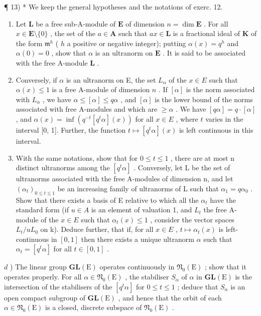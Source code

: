 ¶ 13) * We keep the general hypotheses and the notations of exerc. 12.

\begin{enumerate}
\def\labelenumi{\alph{enumi})}
\item
  Let \(\mathbf{L}\) be a free sub-A-module of \(\mathbf{E}\) of dimension \(n = \dim \mathbf{E}\) . For all \(x \in \mathbf{E} \setminus \{0\}\) , the set of the \(a \in \mathbf{A}\) such that \(ax \in \mathbf{L}\) is a fractional ideal of \(\mathbf{K}\) of the form \(\mathfrak{m}^h\) ( \(h\) a positive or negative integer); putting \(\alpha(x) = q^h\) and \(\alpha(0) = 0\) , show that \(\alpha\) is an ultranorm on \(\mathbf{E}\) . It is said to be associated with the free A-module \(\mathbf{L}\) .
\item
  Conversely, if \(\alpha\) is an ultranorm on E, the set \(L_{\alpha}\) of the \(x \in E\) such that \(\alpha(x) \leqslant 1\) is a free A-module of dimension \(n\) . If \([\alpha]\) is the norm associated with \(L_{\alpha}\) , we have \(\alpha \leqslant [\alpha] \leqslant q\alpha\) , and \([\alpha]\) is the lower bound of the norms associated with free A-modules and which are \(\geqslant \alpha\) . We have \([q\alpha] = q \cdot [\alpha]\) , and \(\alpha(x) = \inf(q^{-t}[q^t\alpha](x))\) for all \(x \in E\) , where \(t\) varies in the interval {[}0, 1{]}. Further, the function \(t \mapsto [q^t\alpha](x)\) is left continuous in this interval.
\item
  With the same notations, show that for \(0 \leqslant t \leqslant 1\) , there are at most n distinct ultranorms among the \([q^{t}\alpha]\) . Conversely, let L be the set of ultranorms associated with the free A-modules of dimension n, and let \((\alpha_{t})_{0 \leqslant t \leqslant 1}\) be an increasing family of ultranorms of L such that \(\alpha_{1} = q\alpha_{0}\) . Show that there exists a basis of E relative to which all the \(\alpha_{t}\) have the standard form (if \(u \in A\) is an element of valuation 1, and \(L_{t}\) the free A-module of the \(x \in E\) such that \(\alpha_{t}(x) \leqslant 1\) , consider the vector spaces \(L_{t}/uL_{0}\) on k). Deduce further, that if, for all \(x \in E\) , \(t \mapsto \alpha_{t}(x)\) is left-continuous in \([0, 1]\) then there exists a unique ultranorm \(\alpha\) such that \(\alpha_{t} = [q^{t}\alpha]\) for all \(t \in [0, 1]\) .
\end{enumerate}

\(d\) ) The linear group \(\mathbf{GL}(\mathrm{E})\) operates continuously in \(\mathfrak{N}_0(\mathrm{E})\) ; show that it operates properly. For all \(\alpha \in \mathfrak{N}_0(\mathrm{E})\) , the stabiliser \(S_{\alpha}\) of \(\alpha\) in \(\mathbf{GL}(\mathrm{E})\) is the intersection of the stabilisers of the \([q^t\alpha]\) for \(0\leqslant t\leqslant 1\) ; deduce that \(S_{\alpha}\) is an open compact subgroup of \(\mathbf{GL}(\mathrm{E})\) , and hence that the orbit of each \(\alpha \in \mathfrak{N}_0(\mathrm{E})\) is a closed, discrete subspace of \(\mathfrak{N}_0(\mathrm{E})\) .

